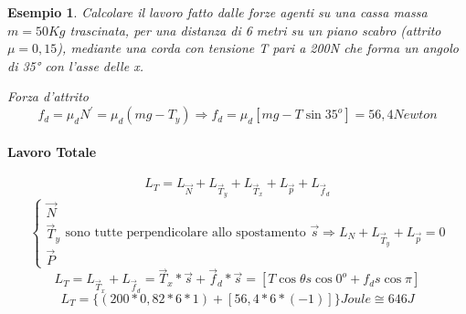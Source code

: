 \documentclass{book}
\newtheorem{esempio}{Esempio}
\begin{document}
\begin{esempio}
	Calcolare il lavoro fatto dalle forze agenti su una cassa massa $m=50Kg$
	trascinata, per una distanza di 6 metri su un piano scabro (attrito
	$\mu=0,15$), mediante una corda con tensione T pari a 200N che forma un
	angolo di 35° con l'asse delle x.
        \begin{center}
            \fbox
            {
            \begin{minipage}{0.75\textwidth}
                    Forza d'attrito
                    \begin{equation*}
                            f_d=\mu_d N^\prime=\mu_d(mg-T_y) \Rightarrow f_d=\mu_d[mg-T\sin
                            35^o]=56,4 Newton
                    \end{equation*}
            \end{minipage}
            }
      	\end{center}
	\paragraph{Lavoro Totale}
	\begin{equation*}
		L_T=L_{\vec{N}}+L_{\vec{T}_y} + L_{\vec{T}_x}+L_{\vec{p}} +
		L_{\vec{f}_d}
	\end{equation*}
	\begin{equation*}
		\begin{cases}
			\vec{N}\\
			\vec{T}_y\\
			\vec{P}
		\end{cases}
		\text{sono tutte perpendicolare allo spostamento } \vec{s} \Rightarrow
		L_N + L_{\vec{T}_y} + L_{\vec{p}} = 0
	\end{equation*}
	\begin{equation*}
		L_T=L_{\vec{T}_x} + L_{\vec{f}_d}=\vec{T}_x*\vec{s} + \vec{f}_d
		*\vec{s} =[T\cos \theta s \cos 0^o +f_ds\cos \pi]
	\end{equation*}
	\begin{equation*}
		L_T=\{(200*0,82*6*1)+[56,4*6*(-1)]\} Joule \cong \boxed{646J}
	\end{equation*}
\end{esempio}
\end{document}
